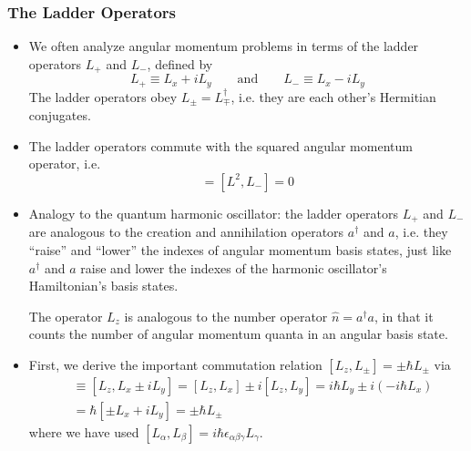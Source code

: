 \documentclass[11pt, a4paper]{article}
\newcommand{\eqtext}[1]{\qquad \text{#1} \qquad}
\newcommand{\Herm}{Hermitian\xspace}
\begin{document}
\subsubsection{The Ladder Operators}
\begin{itemize}
	\item We often analyze angular momentum problems in terms of the ladder operators $ L_{+} $ and $ L_{-} $, defined by
	\begin{equation*}
		L_{+} \equiv L_{x} + iL_{y} \eqtext{and} L_{-} \equiv L_{x} - i L_{y}
	\end{equation*}
	The ladder operators obey $ L_{\pm} = L_{\mp}^{\dagger} $, i.e. they are each other's \Herm conjugates.
	
	\item The ladder operators commute with the squared angular momentum operator, i.e.
	\begin{equation*}
		[L^{2}, L_{+}] = [L^{2}, L_{-}] = 0
	\end{equation*}
	
	\item Analogy to the quantum harmonic oscillator: the ladder operators $ L_{+} $ and $ L_{-} $ are analogous to the creation and annihilation operators $ a^{\dagger} $  and $ a $, i.e. they ``raise'' and ``lower'' the indexes of angular momentum basis states, just like $ a^{\dagger} $ and $ a $ raise and lower the indexes of the harmonic oscillator's Hamiltonian's basis states. 
	
	The operator $ L_{z} $ is analogous to the number operator $ \hat{n} = a^{\dagger}a $, in that it counts the number of angular momentum quanta in an angular basis state. 
	
	\item First, we derive the important commutation relation $ [L_{z}, L_{\pm}] = \pm \hbar L_{\pm} $ via
	\begin{align*}
		[L_{z}, L_{\pm}] &\equiv [L_{z}, L_{x} \pm i L_{y}] = [L_{z}, L_{x}] \pm i [L_{z}, L_{y}] = i \hbar L_{y} \pm i(-i \hbar L_{x})\\
		& = \hbar [\pm L_{x} + iL_{y}] = \pm \hbar L_{\pm}
	\end{align*}
	where we have used $ [L_{\alpha}, L_{\beta}] = i \hbar \epsilon_{\alpha \beta \gamma} L_{\gamma} $.
	

\end{itemize}
\end{document}

